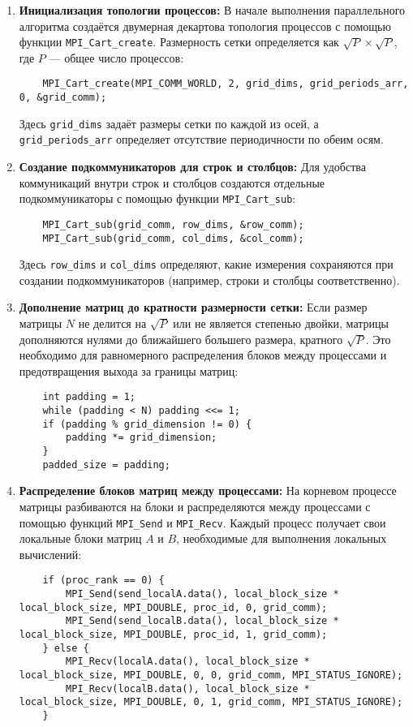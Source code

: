 \documentclass{report}
\begin{document}
\begin{enumerate}
    \item \textbf{Инициализация топологии процессов:}  
    В начале выполнения параллельного алгоритма создаётся двумерная декартова топология процессов с помощью функции \texttt{MPI\_Cart\_create}. Размерность сетки определяется как $\sqrt{P} \times \sqrt{P}$, где $P$ — общее число процессов:
    \begin{lstlisting}
    MPI_Cart_create(MPI_COMM_WORLD, 2, grid_dims, grid_periods_arr, 0, &grid_comm);
    \end{lstlisting}
    Здесь \texttt{grid\_dims} задаёт размеры сетки по каждой из осей, а \texttt{grid\_periods\_arr} определяет отсутствие периодичности по обеим осям.

    \item \textbf{Создание подкоммуникаторов для строк и столбцов:}  
    Для удобства коммуникаций внутри строк и столбцов создаются отдельные подкоммуникаторы с помощью функции \texttt{MPI\_Cart\_sub}:
    \begin{lstlisting}
    MPI_Cart_sub(grid_comm, row_dims, &row_comm);
    MPI_Cart_sub(grid_comm, col_dims, &col_comm);
    \end{lstlisting}
    Здесь \texttt{row\_dims} и \texttt{col\_dims} определяют, какие измерения сохраняются при создании подкоммуникаторов (например, строки и столбцы соответственно).

    \item \textbf{Дополнение матриц до кратности размерности сетки:}  
    Если размер матрицы $N$ не делится на $\sqrt{P}$ или не является степенью двойки, матрицы дополняются нулями до ближайшего большего размера, кратного $\sqrt{P}$. Это необходимо для равномерного распределения блоков между процессами и предотвращения выхода за границы матриц:
    \begin{lstlisting}
    int padding = 1;
    while (padding < N) padding <<= 1;
    if (padding % grid_dimension != 0) {
        padding *= grid_dimension;
    }
    padded_size = padding;
    \end{lstlisting}

    \item \textbf{Распределение блоков матриц между процессами:}  
    На корневом процессе матрицы разбиваются на блоки и распределяются между процессами с помощью функций \texttt{MPI\_Send} и \texttt{MPI\_Recv}. Каждый процесс получает свои локальные блоки матриц $A$ и $B$, необходимые для выполнения локальных вычислений:
    \begin{lstlisting}
    if (proc_rank == 0) {
        MPI_Send(send_localA.data(), local_block_size * local_block_size, MPI_DOUBLE, proc_id, 0, grid_comm);
        MPI_Send(send_localB.data(), local_block_size * local_block_size, MPI_DOUBLE, proc_id, 1, grid_comm);
    } else {
        MPI_Recv(localA.data(), local_block_size * local_block_size, MPI_DOUBLE, 0, 0, grid_comm, MPI_STATUS_IGNORE);
        MPI_Recv(localB.data(), local_block_size * local_block_size, MPI_DOUBLE, 0, 1, grid_comm, MPI_STATUS_IGNORE);
    }
    \end{lstlisting}


\end{enumerate}
\end{document}
